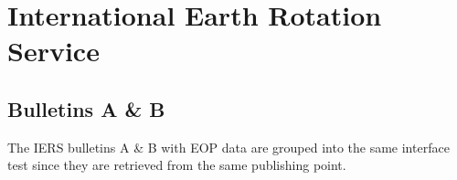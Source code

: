 \documentclass[dec_sum_main.tex]{subfiles}
\begin{document}
\pagebreak

\section{International Earth Rotation Service}

\subsection{Bulletins A \& B}
The IERS bulletins A \& B with EOP data are grouped into the same interface test since they are retrieved from the same publishing point. \newline

 \newline
\end{document}
